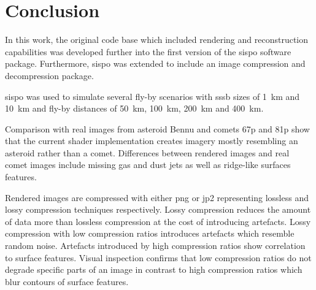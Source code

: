 \section{Conclusion} \label{sec:conclusion}
In this work, the original code base which included rendering and reconstruction capabilities was developed further into the first version of the \gls{sispo} software package. Furthermore, \gls{sispo} was extended to include an image compression and decompression package.

\Gls{sispo} was used to simulate several fly-by scenarios with \gls{sssb} sizes of \SI{1}{\kilo\meter} and \SI{10}{\kilo\meter} and fly-by distances of \SI{50}{\kilo\meter}, \SI{100}{\kilo\meter}, \SI{200}{\kilo\meter} and \SI{400}{\kilo\meter}.

Comparison with real images from asteroid Bennu and comets \gls{67p} and \gls{81p} show that the current shader implementation creates imagery mostly resembling an asteroid rather than a comet. Differences between rendered images and real comet images include missing gas and dust jets as well as ridge-like surfaces features.

Rendered images are compressed with either \gls{png} or \gls{jp2} representing lossless and lossy compression techniques respectively. Lossy compression reduces the amount of data more than lossless compression at the cost of introducing artefacts. Lossy compression with low compression ratios introduces artefacts which resemble random noise. Artefacts introduced by high compression ratios show correlation to surface features. Visual inspection confirms that low compression ratios do not degrade specific parts of an image in contrast to high compression ratios which blur contours of surface features.

